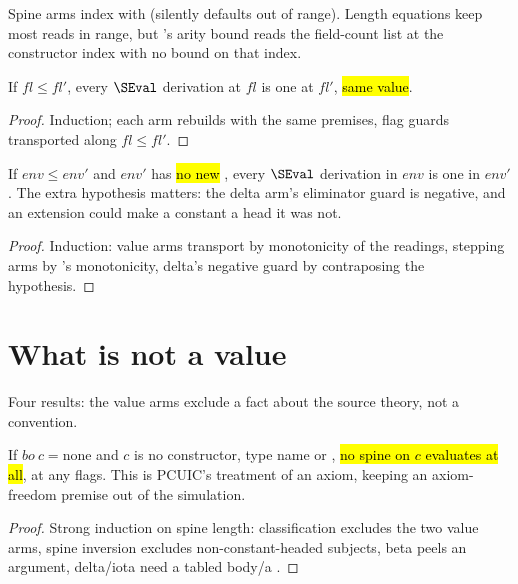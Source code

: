 \begin{remark}
 Spine arms index with  (silently defaults out of range). Length
equations keep most reads in range, but 's arity bound reads the field-count list at
the constructor index with no bound on that index.
\end{remark}

\begin{lemma}
\label{lem:SEval-mono}
\leanok
{}
 If $fl \le fl'$, every $\SEval$ derivation at $fl$ is one at $fl'$, \hl{same
value}.
\end{lemma}
\begin{proof}
\leanok
{}
 Induction; each arm rebuilds with the same premises, flag guards transported along
$fl\le fl'$.
\end{proof}

\begin{lemma}
\label{lem:SEval-le}
\leanok
{}
 If $env \le env'$ and $env'$ has \hl{no new }, every $\SEval$
derivation in $env$ is one in $env'$.
 The extra hypothesis matters: the delta arm's eliminator guard is negative, and an
extension could make a constant a  head it was not.
\end{lemma}
\begin{proof}
\leanok
{}
 Induction: value arms transport by monotonicity of the readings, stepping arms by
's monotonicity, delta's negative guard by contraposing the hypothesis.
\end{proof}

\section{What is not a value}
\label{sec:source:values}

Four results: the value arms exclude a fact about the source theory, not a convention.

\begin{lemma}
\label{lem:untabled_const_not_value}
\leanok
{}
 If $bo\ c=\mathrm{none}$ and $c$ is no constructor, type name or
, \hl{no spine on $c$ evaluates at all}, at any flags.
 This is PCUIC's treatment of an axiom, keeping an axiom-freedom premise out of the
simulation.
\end{lemma}
\begin{proof}
\leanok
{}
 Strong induction on spine length: classification excludes the two value arms, spine
inversion excludes non-constant-headed subjects, beta peels an argument, delta/iota need a tabled
body/a .
\end{proof}

